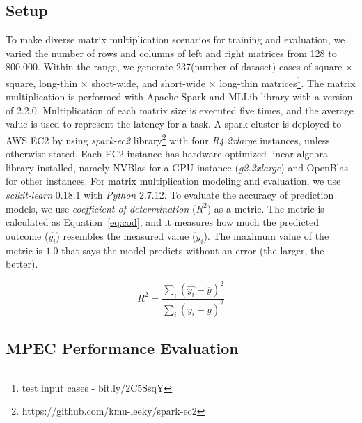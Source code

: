 \documentclass[10pt, conference, compsocconf]{IEEEtran}
\begin{document}
\subsection{Setup}
To make diverse matrix multiplication scenarios for training and evaluation, we varied the number of rows and columns of left and right matrices from 128 to 800,000. Within the range, we generate 237(number of dataset) cases of square $\times$ square, long-thin $\times$ short-wide, and short-wide $\times$ long-thin matrices\footnote{test input cases - bit.ly/2C5SsqY}. The matrix multiplication is performed with Apache Spark and MLLib library with a version of 2.2.0. Multiplication of each matrix size is executed five times, and the average value is used to represent the latency for a task. A spark cluster is deployed to AWS EC2 by using \textit{spark-ec2} library\footnote{https://github.com/kmu-leeky/spark-ec2} with four \textit{R4.2xlarge} instances, unless otherwise stated. Each EC2 instance has hardware-optimized linear algebra library installed, namely NVBlas for a GPU instance (\textit{g2.2xlarge}) and OpenBlas for other instances. For matrix multiplication modeling and evaluation, we use \textit{scikit-learn} 0.18.1 with \textit{Python} 2.7.12. To evaluate the accuracy of prediction models, we use \textit{coefficient of determination} ($R^2$) as a metric. The metric is calculated as Equation~\ref{eq:cod}, and it measures how much the predicted outcome ($\hat{y_i}$) resembles the measured value ($y_i$). The maximum value of the metric is $1.0$ that says the model predicts without an error (the larger, the better).

\begin{equation}\label{eq:cod}
  R^2 = \frac{\sum\limits_{i} (\hat{y_i}-\overline{y})^2}{\sum\limits_{i} (y_i-\overline{y})^2}
\end{equation}


\subsection{MPEC Performance Evaluation}
\end{document}

